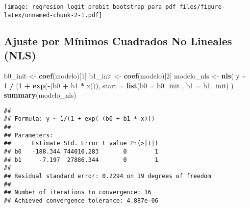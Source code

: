 \documentclass[
]{article}
\newenvironment{Shaded}{\begin{snugshade}}{\end{snugshade}}
\newcommand{\AttributeTok}[1]{\textcolor[rgb]{0.13,0.29,0.53}{#1}}
\newcommand{\DecValTok}[1]{\textcolor[rgb]{0.00,0.00,0.81}{#1}}
\newcommand{\FunctionTok}[1]{\textcolor[rgb]{0.13,0.29,0.53}{\textbf{#1}}}
\newcommand{\NormalTok}[1]{#1}
\newcommand{\OtherTok}[1]{\textcolor[rgb]{0.56,0.35,0.01}{#1}}
\newcommand{\SpecialCharTok}[1]{\textcolor[rgb]{0.81,0.36,0.00}{\textbf{#1}}}
\begin{document}
\texttt{[image: regresion\_logit\_probit\_bootstrap\_para\_pdf\_files/figure-latex/unnamed-chunk-2-1.pdf]}

\subsection{Ajuste por Mínimos Cuadrados No Lineales
(NLS)}\label{ajuste-por-muxednimos-cuadrados-no-lineales-nls}

\begin{Shaded}
\begin{Highlighting}[]
\NormalTok{b0\_init }\OtherTok{\textless{}{-}} \FunctionTok{coef}\NormalTok{(modelo)[}\DecValTok{1}\NormalTok{]}
\NormalTok{b1\_init }\OtherTok{\textless{}{-}} \FunctionTok{coef}\NormalTok{(modelo)[}\DecValTok{2}\NormalTok{]}
\NormalTok{modelo\_nls }\OtherTok{\textless{}{-}} \FunctionTok{nls}\NormalTok{(}
\NormalTok{  y }\SpecialCharTok{\textasciitilde{}} \DecValTok{1} \SpecialCharTok{/}\NormalTok{ (}\DecValTok{1} \SpecialCharTok{+} \FunctionTok{exp}\NormalTok{(}\SpecialCharTok{{-}}\NormalTok{(b0 }\SpecialCharTok{+}\NormalTok{ b1 }\SpecialCharTok{*}\NormalTok{ x))),}
  \AttributeTok{start =} \FunctionTok{list}\NormalTok{(}\AttributeTok{b0 =}\NormalTok{ b0\_init , }\AttributeTok{b1 =}\NormalTok{ b1\_init)}
\NormalTok{)}
\FunctionTok{summary}\NormalTok{(modelo\_nls)}
\end{Highlighting}
\end{Shaded}

\begin{verbatim}
## 
## Formula: y ~ 1/(1 + exp(-(b0 + b1 * x)))
## 
## Parameters:
##      Estimate Std. Error t value Pr(>|t|)
## b0   -188.344 744010.283       0        1
## b1     -7.197  27886.344       0        1
## 
## Residual standard error: 0.2294 on 19 degrees of freedom
## 
## Number of iterations to convergence: 16 
## Achieved convergence tolerance: 4.887e-06
\end{verbatim}
\end{document}
